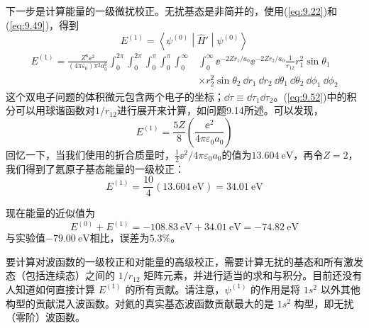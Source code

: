     下一步是计算能量的一级微扰校正。无扰基态是非简并的，使用(\ref{eq:9.22})和(\ref{eq:9.49})，得到
    \begin{equation*}
        E^{\left(1\right)} = \left\langle \psi^{\left(0\right)} \middle| \hat{H}' \middle| \psi^{\left(0\right)} \right\rangle
    \end{equation*}
    \begin{equation}
        \begin{aligned}
            E^{\left(1\right)} = \frac{Z^6\ee ^2}{\left(4\pi\varepsilon_0\right)\pi^2a_0^6} \int_{0}^{2\pi} \int_{0}^{2\pi} \int_{0}^{\pi} \int_{0}^{\pi} \int_{0}^{\infty} & \int_{0}^{\infty}  \ee ^{-2Zr_1/a_0} \ee ^{-2Zr_2/a_0} \frac{1}{r_{12}}r_1^2 \sin\theta_1 \\
            & \times r^2 _2 \sin\theta_2 \:\dd r_1 \:\dd r_2 \:\dd \theta_1 \:\dd \theta_2 \:\dd \phi_1 \:\dd \phi_2
        \end{aligned}
        \label{eq:9.52}
    \end{equation}
    这个双电子问题的体积微元包含两个电子的坐标；$\dd \tau \equiv \dd \tau_1 \dd \tau_2$。(\ref{eq:9.52})中的积分可以用球谐函数对$1/r_{12}$进行展开来计算，如问题9.14所述。可以发现，
    \begin{equation}
        E^{\left(1\right)} = \frac{5Z}{8}\left(\frac{\ee ^2}{4\pi\varepsilon_0a_0}\right)
        \label{eq:9.53}
    \end{equation}
    回忆一下，当我们使用的折合质量时，$\frac{1}{2}\ee ^2/4\pi\varepsilon_0a_0$的值为$13.604 \: \mathrm{eV}$，再令$Z=2$，我们得到了氦原子基态能量的一级校正：
    \begin{equation*}
        E^{\left(1\right)} = \frac{10}{4}\left(13.604 \: \mathrm{eV}\right) = 34.01 \: \mathrm{eV}
    \end{equation*}

    现在能量的近似值为
    \begin{equation}
        E^{\left(0\right)} + E^{\left(1\right)} = -108.83 \: \mathrm{eV} + 34.01 \: \mathrm{eV} = -74.82 \: \mathrm{eV}
        \label{eq:9.54}
    \end{equation}
    与实验值$-79.00 \: \mathrm{eV}$相比，误差为$5.3\%$。

    要计算对波函数的一级校正和对能量的高级校正，需要计算无扰的基态和所有激发态（包括连续态）之间的 $1/r_{12}$ 矩阵元素，并进行适当的求和与积分。目前还没有人知道如何直接计算 $E^{\left(1\right)}$ 的所有贡献。请注意，$\psi^{\left(1\right)}$ 的作用是将 $1s^2$ 以外其他构型的贡献混入波函数。对氦的真实基态波函数贡献最大的是 $1s^2$ 构型，即无扰（零阶）波函数。

